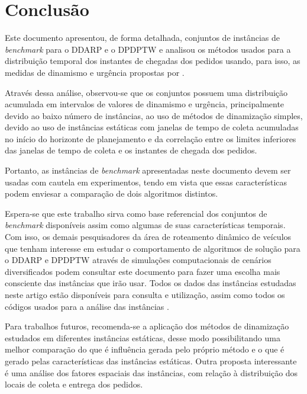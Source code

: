 \chapter{Conclusão}\label{ch:conclusao}


Este documento apresentou, de forma detalhada, conjuntos de instâncias de 
\textit{benchmark} para o DDARP e o DPDPTW e analisou os métodos usados para a 
distribuição temporal dos instantes de chegadas dos pedidos usando, para isso,
as medidas de dinamismo e urgência propostas por 
.

Através dessa análise, observou-se que os conjuntos possuem uma distribuição 
acumulada em intervalos de valores de dinamismo e urgência, principalmente 
devido ao baixo número de instâncias, ao uso de métodos de dinamização simples,
devido ao uso de instâncias estáticas com janelas de tempo de coleta
acumuladas no início do horizonte de planejamento e da correlação entre os
limites inferiores das janelas de tempo de coleta e os instantes de chegada dos
pedidos.  

Portanto, as instâncias de \textit{benchmark} apresentadas neste documento
devem ser usadas com cautela em experimentos, tendo em vista que 
essas características podem enviesar a comparação de dois algoritmos distintos.

Espera-se que este trabalho sirva como base referencial dos conjuntos de 
\textit{benchmark} disponíveis assim como algumas de suas características
temporais. 
Com isso, os demais pesquisadores da área de roteamento dinâmico de 
veículos que tenham interesse em estudar o comportamento de algoritmos de 
solução para o DDARP e DPDPTW através de simulações computacionais de cenários 
diversificados podem consultar este documento para fazer uma escolha mais
consciente das instâncias que irão usar.
Todos os dados das instâncias estudadas neste artigo estão disponíveis para 
consulta e utilização, assim como todos os códigos usados para a análise das 
instâncias \cite{eccel_problemas_2019}.

Para trabalhos futuros, recomenda-se a aplicação dos métodos de dinamização
estudados em diferentes instâncias estáticas, desse modo possibilitando uma
melhor comparação do que é influência gerada pelo próprio método e o que é 
gerado pelas características das instâncias estáticas.
Outra proposta interessante é uma análise dos fatores espaciais das 
instâncias, com relação à distribuição dos locais de coleta e entrega dos 
pedidos.
